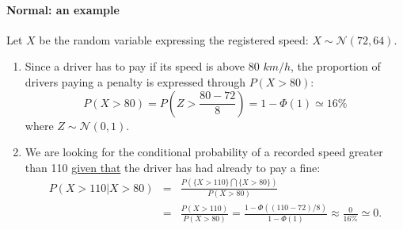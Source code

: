 \documentclass[notes=show,smaller]{beamer}\usepackage[]{graphicx}\usepackage[]{color}
\begin{document}
\begin{frame}{\subsecname}
  \framesubtitle{Normal: an example}

  \begin{example}[continued]
  \begin{footnotesize}
  Let $X$ be the random variable expressing the registered speed: $X \sim \mathcal{N}(72,64)$.
  \begin{enumerate}
    \item Since a driver has to pay if its speed is above  $80$ $km/h$, the proportion of drivers paying a penalty is expressed  through $P(X>80)$:
  \begin{equation*}
  P(X>80)= P\left(Z>\frac{80-72}{8} \right)=1-\Phi(1) \simeq 16 \%
  \end{equation*}
  where $Z \sim \mathcal{N}(0,1)$.
  \pause
    \item We are looking for the conditional probability of a recorded speed greater than 110 \underline{given that} the driver has had already to pay a fine:
    \begin{eqnarray*}
    P(X>110 \vert X>80) &=&  \frac{P(\{X>110\} \bigcap \{X>80\})}{P(X>80)} \\
     &=& \frac{P(X>110)}{P(X>80)} = \frac{1- \Phi((110-72)/8)}{1-\Phi(1)}\approx \frac{0}{16\%}\simeq 0.
    \end{eqnarray*}
  \end{enumerate}
  \end{footnotesize}
  \end{example}
\end{frame}
\end{document}
